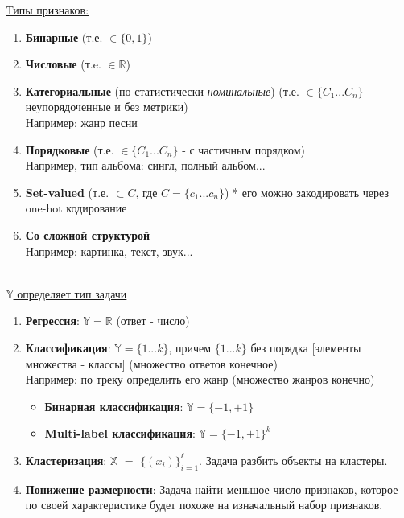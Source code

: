     \underline{Типы признаков:}
    \begin{enumerate}
        \item \textbf{Бинарные} (т.е. $\in \{0, 1\}$)
        \item \textbf{Числовые} (т.e. $\in \mathbb{R}$)
        \item \textbf{Категориальные} (по-статистически \textit{номинальные}) (т.е. $\in \{C_1 ... C_n \}$ $-$ неупорядоченные и без метрики) \\Например: жанр песни
        \item \textbf{Порядковые} (т.е. $\in \{C_1 ... C_n \}$ - с частичным порядком) \\Например, тип альбома: сингл, полный альбом...
        \item \textbf{Set-valued} (т.е. $\subset C$, где $C = \{c_1 ... c_n  \}$) * его можно закодировать через one-hot кодирование
        \item \textbf{Со сложной структурой} \\Например: картинка, текст, звук...\\\\
    \end{enumerate}

    \underline{$\mathbb{Y}$ определяет тип задачи}
    \begin{enumerate}
        \item \textbf{Регрессия}: $\mathbb{Y} = \mathbb{R}$ (ответ - число)
        \item \textbf{Классификация}: $\mathbb{Y} = \{1 ... k \}$, причем $\{1 ... k \}$ без порядка [элементы множества - классы] (множество ответов конечное) \\Например: по треку определить его жанр (множество жанров конечно)\\
        \begin{itemize}
            \item \textbf{Бинарная классификация}: $\mathbb{Y} = \{-1, +1\}$
            \item \textbf{Multi-label классификация}: $\mathbb{Y} = \{-1, +1 \}^k$
        \end{itemize}
    
        
        \item \textbf{Кластеризация}: $\mathbb{X}$ $=$ $\{(x_i) \}_{i=1}^\ell$. Задача разбить объекты на кластеры.
        \item \textbf{Понижение размерности}: Задача найти меньшое число признаков, которое по своей характеристике будет похоже на изначальный набор признаков.

    \end{enumerate}
    

